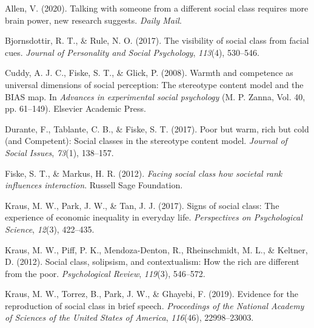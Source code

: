 \documentclass[
  man,floatsintext]{apa6}
\newlength{\cslhangindent}
\newlength{\cslentryspacingunit} %
\newenvironment{CSLReferences}[2] %
 {%
  \setlength{\parindent}{0pt}
  \ifodd #1
  \let\oldpar\par
  \def\par{\hangindent=\cslhangindent\oldpar}
  \fi
  \setlength{\parskip}{#2\cslentryspacingunit}
 }%
 {}
\begin{document}
\hypertarget{refs}{}
\begin{CSLReferences}{1}{0}
\leavevmode{}%
Allen, V. (2020). Talking with someone from a different social class requires more brain power, new research suggests. \emph{Daily Mail}.

\leavevmode{}%
Bjornsdottir, R. T., \& Rule, N. O. (2017). The visibility of social class from facial cues. \emph{Journal of Personality and Social Psychology}, \emph{113}(4), 530--546.

\leavevmode{}%
Cuddy, A. J. C., Fiske, S. T., \& Glick, P. (2008). Warmth and competence as universal dimensions of social perception: {The} stereotype content model and the {BIAS} map. In \emph{Advances in experimental social psychology} (M. P. Zanna, Vol. 40, pp. 61--149). {Elsevier Academic Press}.

\leavevmode{}%
Durante, F., Tablante, C. B., \& Fiske, S. T. (2017). Poor but warm, rich but cold (and {Competent}): {Social} classes in the stereotype content model. \emph{Journal of Social Issues}, \emph{73}(1), 138--157.

\leavevmode{}%
Fiske, S. T., \& Markus, H. R. (2012). \emph{Facing social class how societal rank influences interaction}. {Russell Sage Foundation}.

\leavevmode{}%
Kraus, M. W., Park, J. W., \& Tan, J. J. (2017). Signs of social class: {The} experience of economic inequality in everyday life. \emph{Perspectives on Psychological Science}, \emph{12}(3), 422--435.

\leavevmode{}%
Kraus, M. W., Piff, P. K., Mendoza-Denton, R., Rheinschmidt, M. L., \& Keltner, D. (2012). Social class, solipsism, and contextualism: {How} the rich are different from the poor. \emph{Psychological Review}, \emph{119}(3), 546--572.

\leavevmode{}%
Kraus, M. W., Torrez, B., Park, J. W., \& Ghayebi, F. (2019). Evidence for the reproduction of social class in brief speech. \emph{Proceedings of the National Academy of Sciences of the United States of America}, \emph{116}(46), 22998--23003.


\end{CSLReferences}
\end{document}
